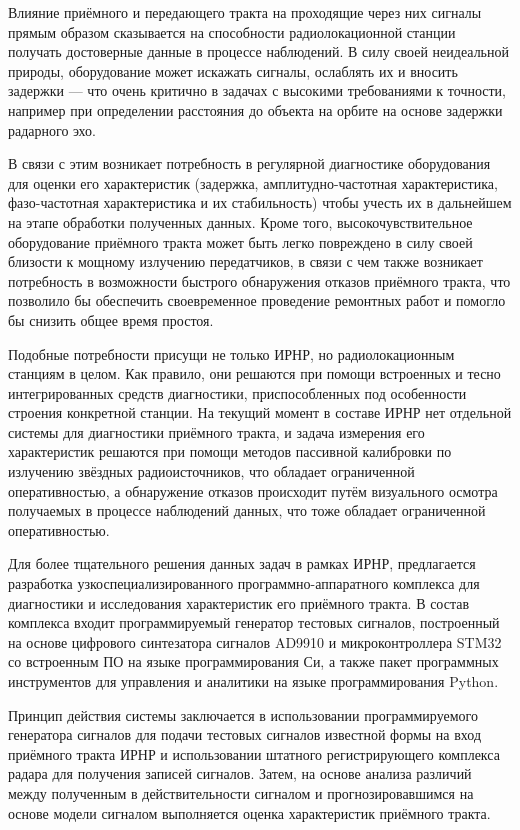 \documentclass{report}
\begin{document}
Влияние приёмного и передающего тракта на проходящие через них сигналы прямым образом сказывается на способности радиолокационной станции получать достоверные данные в процессе наблюдений. В силу своей неидеальной природы, оборудование может искажать сигналы, ослаблять их и вносить задержки --- что очень критично в задачах с высокими требованиями к точности, например при определении расстояния до объекта на орбите на основе задержки радарного эхо.

В связи с этим возникает потребность в регулярной диагностике оборудования для оценки его характеристик (задержка, амплитудно-частотная характеристика, фазо-частотная характеристика и их стабильность) чтобы учесть их в дальнейшем на этапе обработки полученных данных. Кроме того, высокочувствительное оборудование приёмного тракта может быть легко повреждено в силу своей близости к мощному излучению передатчиков, в связи с чем также возникает потребность в возможности быстрого обнаружения отказов приёмного тракта, что позволило бы обеспечить своевременное проведение ремонтных работ и помогло бы снизить общее время простоя.

Подобные потребности присущи не только ИРНР, но радиолокационным станциям в целом. Как правило, они решаются при помощи встроенных и тесно интегрированных средств диагностики, приспособленных под особенности строения конкретной станции. На текущий момент в составе ИРНР нет отдельной системы для диагностики приёмного тракта, и задача измерения его характеристик решаются при помощи методов пассивной калибровки по излучению звёздных радиоисточников, что обладает ограниченной оперативностью, а обнаружение отказов происходит путём визуального осмотра получаемых в процессе наблюдений данных, что тоже обладает ограниченной оперативностью.

Для более тщательного решения данных задач в рамках ИРНР, предлагается разработка узкоспециализированного программно-аппаратного комплекса для диагностики и исследования характеристик его приёмного тракта. В состав комплекса входит программируемый генератор тестовых сигналов, построенный на основе цифрового синтезатора сигналов AD9910 и микроконтроллера STM32 со встроенным ПО на языке программирования Си, а также пакет программных инструментов для управления и аналитики на языке программирования Python.

Принцип действия системы заключается в использовании программируемого генератора сигналов для подачи тестовых сигналов известной формы на вход приёмного тракта ИРНР и использовании штатного регистрирующего комплекса радара для получения записей сигналов. Затем, на основе анализа различий между полученным в действительности сигналом и прогнозировавшимся на основе модели сигналом выполняется оценка характеристик приёмного тракта.
\end{document}
